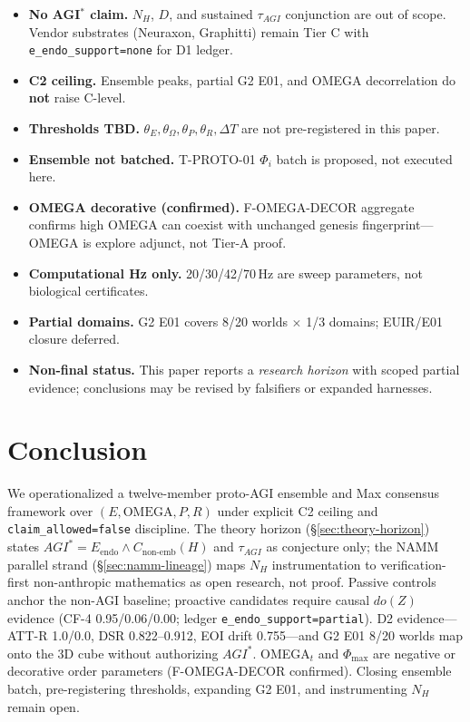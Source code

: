 \documentclass[11pt,a4paper]{article}
\theoremstyle{definition}
\begin{document}
\begin{itemize}[leftmargin=*]
\item \textbf{No AGI$^{*}$ claim.} $N_H$, $D$, and sustained $\tau_{AGI}$ conjunction are out of scope. Vendor substrates (Neuraxon, Graphitti) remain Tier C with \texttt{e\_endo\_support=none} for D1 ledger.
\item \textbf{C2 ceiling.} Ensemble peaks, partial G2 E01, and OMEGA decorrelation do \textbf{not} raise C-level.
\item \textbf{Thresholds TBD.} $\theta_E,\theta_\Omega,\theta_P,\theta_R,\Delta T$ are not pre-registered in this paper.
\item \textbf{Ensemble not batched.} T-PROTO-01 $\Phi_i$ batch is proposed, not executed here.
\item \textbf{OMEGA decorative (confirmed).} F-OMEGA-DECOR aggregate confirms high OMEGA can coexist with unchanged genesis fingerprint---OMEGA is explore adjunct, not Tier-A proof.
\item \textbf{Computational Hz only.} 20/30/42/70\,Hz are sweep parameters, not biological certificates.
\item \textbf{Partial domains.} G2 E01 covers 8/20 worlds $\times$ 1/3 domains; EUIR/E01 closure deferred.
\item \textbf{Non-final status.} This paper reports a \emph{research horizon} with scoped partial evidence; conclusions may be revised by falsifiers or expanded harnesses.
\end{itemize}

\section{Conclusion}\label{sec:conclusion}

We operationalized a twelve-member proto-AGI ensemble and Max consensus framework over $(E,\mathrm{OMEGA},P,R)$ under explicit C2 ceiling and \texttt{claim\_allowed=false} discipline. The theory horizon (\S\ref{sec:theory-horizon}) states $AGI^{*}=E_{\mathrm{endo}}\land C_{\mathrm{non\text{-}emb}}(H)$ and $\tau_{AGI}$ as conjecture only; the NAMM parallel strand (\S\ref{sec:namm-lineage}) maps $N_H$ instrumentation to verification-first non-anthropic mathematics as open research, not proof. Passive controls anchor the non-AGI baseline; proactive candidates require causal $do(Z)$ evidence (CF-4 0.95/0.06/0.00; ledger \texttt{e\_endo\_support=partial}). D2 evidence---ATT-R 1.0/0.0, DSR 0.822--0.912, EOI drift 0.755---and G2 E01 8/20 worlds map onto the 3D cube without authorizing $AGI^{*}$. OMEGA$_t$ and $\Phi_{\max}$ are negative or decorative order parameters (F-OMEGA-DECOR confirmed). Closing ensemble batch, pre-registering thresholds, expanding G2 E01, and instrumenting $N_H$ remain open.
\end{document}
